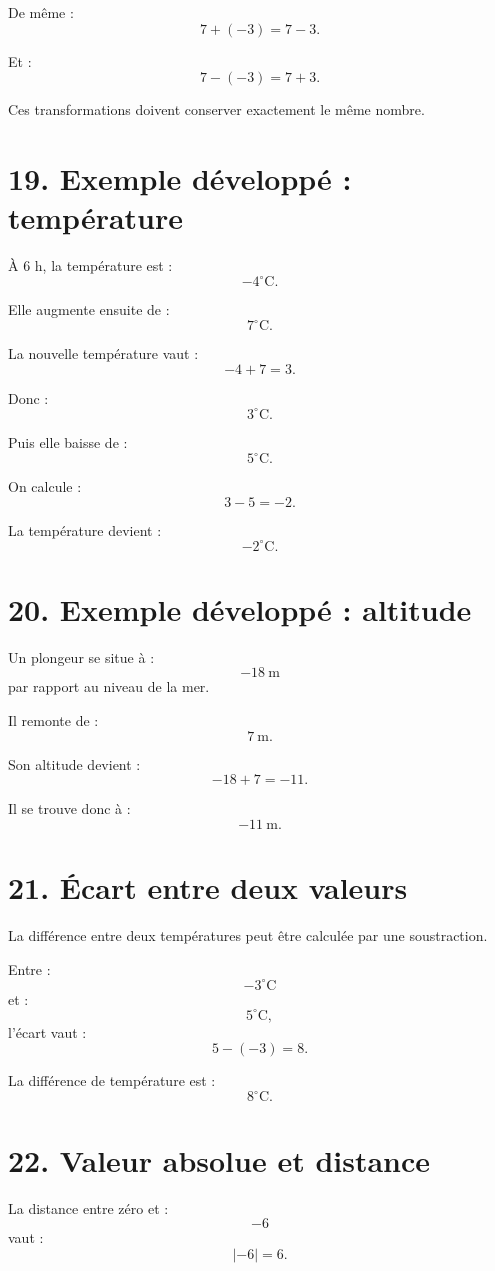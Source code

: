 De même :
\[
7+(-3)=7-3.
\]

Et :
\[
7-(-3)=7+3.
\]

Ces transformations doivent conserver exactement le même nombre.

\section{19. Exemple développé : température}

À $6$ h, la température est :
\[
-4^\circ\text{C}.
\]

Elle augmente ensuite de :
\[
7^\circ\text{C}.
\]

La nouvelle température vaut :
\[
-4+7=3.
\]

Donc :
\[
\boxed{3^\circ\text{C}}.
\]

Puis elle baisse de :
\[
5^\circ\text{C}.
\]

On calcule :
\[
3-5=-2.
\]

La température devient :
\[
\boxed{-2^\circ\text{C}}.
\]

\section{20. Exemple développé : altitude}

Un plongeur se situe à :
\[
-18\ \text{m}
\]
par rapport au niveau de la mer.

Il remonte de :
\[
7\ \text{m}.
\]

Son altitude devient :
\[
-18+7=-11.
\]

Il se trouve donc à :
\[
\boxed{-11\ \text{m}}.
\]

\section{21. Écart entre deux valeurs}

La différence entre deux températures peut être calculée par une soustraction.

Entre :
\[
-3^\circ\text{C}
\]
et :
\[
5^\circ\text{C},
\]
l'écart vaut :
\[
5-(-3)=8.
\]

La différence de température est :
\[
\boxed{8^\circ\text{C}}.
\]

\section{22. Valeur absolue et distance}

La distance entre zéro et :
\[
-6
\]
vaut :
\[
|-6|=6.
\]


